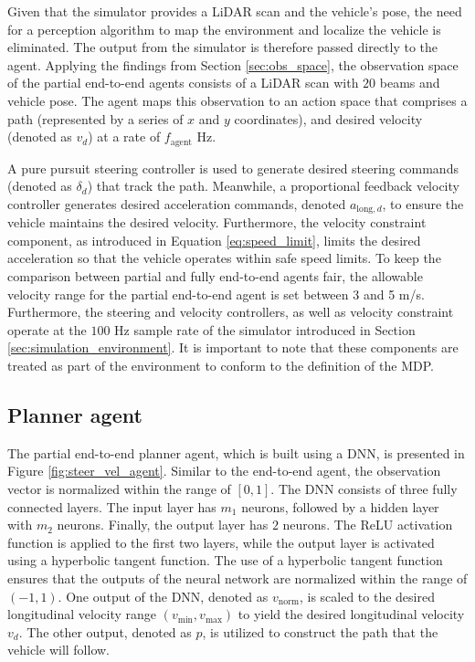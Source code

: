 Given that the simulator provides a LiDAR scan and the vehicle's pose, the need for a perception algorithm to map the environment and localize the vehicle is eliminated. 
The output from the simulator is therefore passed directly to the agent.
Applying the findings from Section \ref{sec:obs_space}, the observation space of the partial end-to-end agents consists of a LiDAR scan with $20$ beams and vehicle pose.
The agent maps this observation to an action space that comprises a path (represented by a series of $x$ and $y$ coordinates), and desired velocity (denoted as $v_{d}$) at a rate of $f_{\text{agent}}$ Hz. 


A pure pursuit steering controller is used to generate desired steering commands (denoted as $\delta_{d}$) that track the path.
Meanwhile, a proportional feedback velocity controller generates desired acceleration commands, denoted $a_{\text{long},d}$, to ensure the vehicle maintains the desired velocity.
Furthermore, the velocity constraint component, as introduced in Equation \ref{eq:speed_limit}, limits the desired acceleration so that the vehicle operates within safe speed limits. 
To keep the comparison between partial and fully end-to-end agents fair, the allowable velocity range for the partial end-to-end agent is set between 3 and 5 m/s.
Furthermore, the steering and velocity controllers, as well as velocity constraint operate at the $100$ Hz sample rate of the simulator introduced in Section \ref{sec:simulation_environment}.
It is important to note that these components are treated as part of the environment to conform to the definition of the MDP. 

\subsection{Planner agent}

The partial end-to-end planner agent, which is built using a DNN, is presented in Figure \ref{fig:steer_vel_agent}. 
Similar to the end-to-end agent, the observation vector is normalized within the range of $[0,1]$.
The DNN consists of three fully connected layers. The input layer has $m_1$ neurons, followed by a hidden layer with $m_2$ neurons. Finally, the output layer has $2$ neurons. 
The ReLU activation function is applied to the first two layers, while the output layer is activated using a hyperbolic tangent function. 
The use of a hyperbolic tangent function ensures that the outputs of the neural network are normalized within the range of $(-1, 1)$.
One output of the DNN, denoted as $v_{\text{norm}}$, is scaled to the desired longitudinal velocity range $(v_{\text{min}}, v_{\text{max}})$ to yield the desired longitudinal velocity $v_{d}$. 
The other output, denoted as $p$, is utilized to construct the path that the vehicle will follow.


